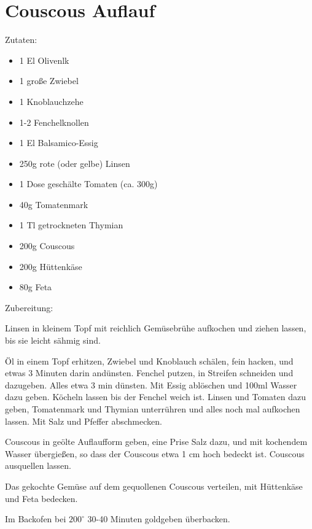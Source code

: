 \section{Couscous Auflauf}
Zutaten:
\begin{itemize}
    \item 1 El Olivenlk
    \item 1 große Zwiebel
    \item 1 Knoblauchzehe
    \item 1-2 Fenchelknollen
    \item 1 El Balsamico-Essig
    \item 250g rote (oder gelbe) Linsen
    \item 1 Dose geschälte Tomaten (ca. 300g)
    \item 40g Tomatenmark
    \item 1 Tl getrockneten Thymian
    \item 200g Couscous
    \item 200g Hüttenkäse
    \item 80g Feta
\end{itemize}

Zubereitung:

Linsen in kleinem Topf mit reichlich Gemüsebrühe aufkochen und ziehen lassen, bis sie leicht sähmig sind.

Öl in einem Topf erhitzen, Zwiebel und Knoblauch schälen, fein hacken, und etwas 3 Minuten darin andünsten. Fenchel putzen, in Streifen schneiden und dazugeben. Alles etwa 3 min dünsten. Mit Essig ablöschen und 100ml Wasser dazu geben. Köcheln lassen bis der Fenchel weich ist. Linsen und Tomaten dazu geben, Tomatenmark und Thymian unterrühren und alles noch mal aufkochen lassen. Mit Salz und Pfeffer abschmecken.

Couscous in geölte Auflaufform geben, eine Prise Salz dazu, und mit kochendem Wasser übergießen, so dass der Couscous etwa 1 cm hoch bedeckt ist. Couscous ausquellen lassen.

Das gekochte Gemüse auf dem gequollenen Couscous verteilen, mit Hüttenkäse und Feta bedecken.

Im Backofen bei $200^\circ$ 30-40 Minuten goldgeben überbacken.
\newpage
\mbox{}
\vfill
\begin{center}
\end{center}
\vfill
\mbox{ }
\newpage
